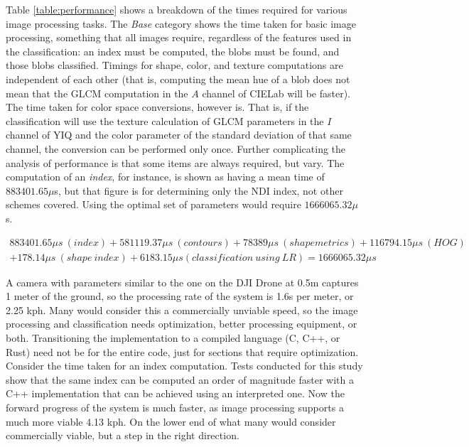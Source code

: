 \documentclass[letterpaper, notitlepage]{report}
\begin{document}
Table \ref{table:performance} shows a breakdown of the times required for various image processing tasks. The \textit{Base} category shows the time taken for basic image processing, something that all images require, regardless of the features used in the classification: an index must be computed, the blobs must be found, and those blobs classified. Timings for shape, color, and texture computations are independent of each other (that is, computing the mean hue of a blob does not mean that the GLCM computation in the $A$ channel of CIELab will be faster). The time taken for color space conversions, however is. That is, if the classification will use the  texture calculation of GLCM parameters in the $I$ channel of YIQ and the color parameter of the standard deviation of that same channel, the conversion can be performed only once. Further complicating the analysis of performance is that some items are always required, but vary. The computation of an \textit{index}, for instance, is shown as having a mean time of $883401.65 \mu$s, but that figure is for determining only the NDI index, not other schemes covered. Using the optimal set of parameters would require $1666065.32 \mu$s. 

\begin{multline}
883401.65 \mu s\ (index) + 581119.37 \mu s\  (contours) + 78389 \mu s\ (shape metrics) + 116794.15 \mu s\ (HOG) \\ + 178.14 \mu s\ (shape\ index) + 6183.15 \mu s (classification\ using\ LR) = 1666065.32 \mu s
\end{multline}

A camera with parameters similar to the one on the DJI Drone at 0.5m captures 1 meter of the ground, so the processing rate of the system is 1.6s per meter, or 2.25 kph. Many would consider this a commercially unviable speed, so the image processing and classification needs optimization, better processing equipment, or both. Transitioning the implementation to a compiled language (C, C++, or Rust) need not be for the entire code, just for sections that require optimization. Consider the time taken for an index computation. Tests conducted for this study show that the same index can be computed an order of magnitude faster with a C++ implementation that can be achieved using an interpreted one. Now the forward progress of the system is much faster, as image processing supports a much more viable 4.13 kph. On the lower end of what many would consider commercially viable, but a step in the right direction.
\end{document}
